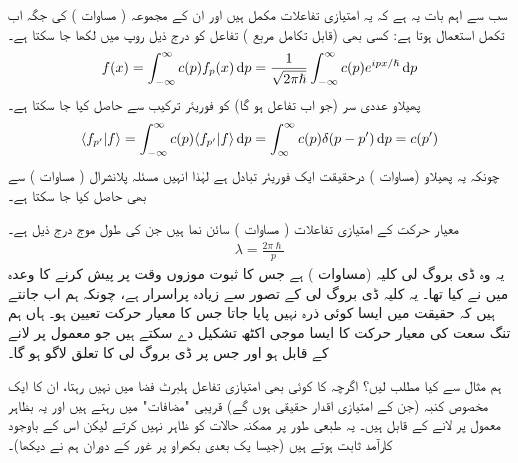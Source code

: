 سب سے اہم بات یہ ہے کہ یہ امتیازی تفاعلات مکمل ہیں اور ان کے مجموعہ ( مساوات ) کی جگہ اب تکمل استعمال ہوتا ہے: کسی بھی (قابل تکامل مربع ) تفاعل  کو درج ذیل روپ میں لکھا جا سکتا ہے۔
\begin{align}\label{مساوات_قواعد_تفاعل_بطور_فوریئر_تکمل}
f(x) = \int_{-\infty}^{\infty} c(p)f_{p}(x)\dif p = \frac{1}{\sqrt{2\pi\hslash}}\int_{-\infty}^{\infty}c(p)e^{ipx/\hslash}\dif p
\end{align}
پھیلاو عددی سر (جو اب تفاعل  ہو گا) کو فوریئر ترکیب سے حاصل کیا جا سکتا ہے۔
\begin{align}
\langle f_{p'} | f \rangle = \int_{-\infty}^{\infty} c(p) \langle f_{p'} | f \rangle \dif p = \int_{\infty}^{\infty}c(p)\delta (p-p') \dif p = c(p')
\end{align}
چونکہ یہ پھیلاو (مساوات ) درحقیقت ایک فوریئر تبادل ہے لہٰذا انہیں مسئلہ پلانشرال ( مساوات ) سے بھی حاصل کیا جا سکتا ہے۔ 

معیار حرکت کے امتیازی تفاعلات ( مساوات ) سائن نما ہیں جن کی طول موج درج ذیل ہے۔
\begin{align}
\lambda = \frac{2\pi\hslash}{p} 
\end{align}
یہ وہ ڈی بروگ لی کلیہ (مساوات ) ہے جس کا ثبوت موزوں وقت پر پیش کرنے کا وعدہ میں نے کیا تھا۔ یہ کلیہ ڈی بروگ لی کے تصور سے زیادہ پراسرار ہے، چونکہ ہم اب جانتے ہیں کہ حقیقت میں ایسا کوئی ذرہ نہیں پایا جاتا جس کا معیار حرکت تعیین ہو۔ ہاں ہم تنگ سعت کی معیار حرکت کا ایسا موجی اکٹھ تشکیل دے سکتے ہیں جو معمول پر لانے کے قابل ہو اور جس پر ڈی بروگ لی کا تعلق لاگو ہو گا۔

ہم مثال  سے کیا مطلب لیں؟ اگرچہ  کا کوئی بھی امتیازی تفاعل ہلبرٹ فضا میں نہیں رہتا، ان کا ایک مخصوص کنبہ (جن کے امتیازی اقدار حقیقی ہوں گے) قریبی "مضافات" میں رہتے ہیں اور یہ بظاہر معمول پر لانے کے قابل ہیں۔ یہ طبعی طور پر ممکنہ حالات کو ظاہر نہیں کرتے لیکن اس کے باوجود کارآمد ثابت ہوتے ہیں (جیسا یک بعدی بکھراو پر غور کے دوران ہم نے دیکھا)۔


